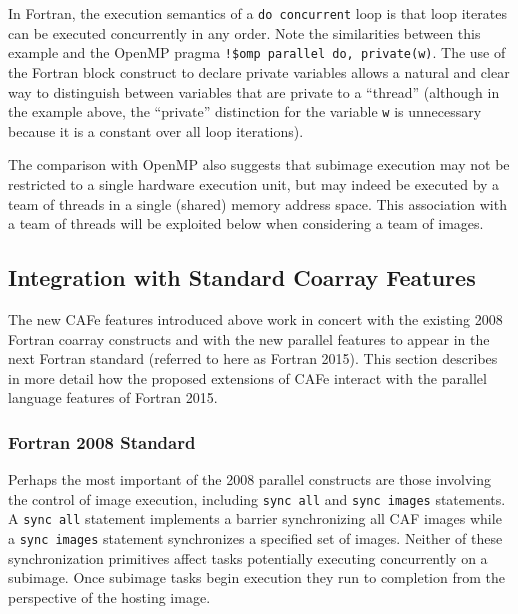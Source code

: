 In Fortran, the execution semantics of a \texttt{do concurrent} loop is that loop
iterates can be executed concurrently in any order.  Note the similarities between this
example and the OpenMP pragma \texttt{!\$omp parallel do, private(w)}.  The use of the
Fortran block construct to declare private variables allows a natural and clear way to
distinguish between variables that are private to a ``thread'' (although in the example
above, the ``private'' distinction for the variable \texttt{w} is unnecessary because it
is a constant over all loop iterations).

The comparison with OpenMP also suggests that subimage execution may not be restricted to
a single hardware execution unit, but may indeed be executed by a team of threads in a
single (shared) memory address space.  This association with a team of threads
will be exploited below when considering a team of images.

\begin{comment}
  (NOTE FOR CRAIG: need to read the standard to see if a block construct can be used in this
way. ALSO, there is a lot more work here to think about how do concurrent merges with
OpenMP and OpenACC with regards to synchronization, barriers, teams, atomics, , critical
sections, ...)
\end{comment}


\subsection{Integration with Standard Coarray Features}

The new CAFe features introduced above work in concert with the existing 2008 Fortran
coarray constructs and with the new parallel features to appear in the next Fortran
standard\cite{TS:18508} (referred to here as Fortran 2015).  This section describes
in more detail how the proposed extensions of CAFe interact with the parallel
language features of Fortran 2015.

\subsubsection{Fortran 2008 Standard}

Perhaps the most important of the 2008 parallel constructs are those involving the
control of image execution, including \texttt{sync all} and \texttt{sync images}
statements.  A \texttt{sync all} statement implements a barrier synchronizing all CAF
images while a \texttt{sync images} statement synchronizes a specified set of images.
Neither of these synchronization primitives affect tasks potentially executing concurrently
on a subimage.  Once subimage tasks begin execution they run to completion from the perspective
of the hosting image.

